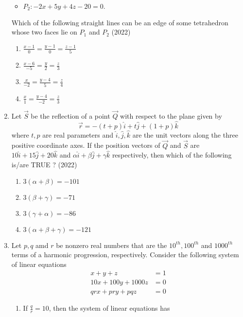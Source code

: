 \begin{enumerate}[label=\thesubsection.\arabic*.,ref=\thesubsection.\theenumi]
\begin{itemize}
 \item $P_2 : -2x + 5y + 4z - 20 = 0$.
\end{itemize}
Which of the following straight lines can be an edge of some tetrahedron whose two faces lie on $P_1$
and $P_2$ 
  \hfill (2022)
\begin{multicols}{2}
\begin{enumerate}
	 \item $\frac{x-1}{0} =\frac{y-1}{0} =\frac{z-1}{5}$ 
	 \item $\frac{x-6}{-5} =\frac{y}{2} =\frac{z}{3}$
	 \item $\frac{x}{-2} =\frac{y-4}{5} =\frac{z}{4}$
	 \item $\frac{x}{1} =\frac{y-4}{-2} =\frac{z}{3}$
\end{enumerate}
\end{multicols}
 \item  Let $\vec{S}$ be the reflection of a point $\vec{Q}$ with respect to the plane given by
$$\overrightarrow{r}=-(t+p)\hat{i}+t\hat{j}+(1+p)\hat{k}$$
 where $t, p$ are real parameters and $\hat{i}, \hat{j} ,\hat{k}$ are the unit vectors along the three positive coordinate 
axes. If the position vectors of $\vec{Q}$ and $\vec{S}$ are $10\hat{i}+ 15\hat{j}+ 20\hat{k} $ and $\alpha\hat{i}+ \beta\hat{j}+ \gamma\hat{k}$ respectively, then which of the following is/are TRUE ?
	\hfill (2022)
\begin{multicols}{2}
\begin{enumerate}
  \item $3(\alpha + \beta) = -101$
  \item $3(\beta + \gamma) = -71$
  \item $3(\gamma + \alpha) = -86$
  \item $3(\alpha + \beta + \gamma) = -121$
\end{enumerate}
\end{multicols}
 \item Let $p,q$ amd $r$  be nonzero real numbers that are the $10^{th}, 100^{th}$ and $1000^{th}$ terms of a harmonic progression, respectively. Consider the following system of linear equations
\begin{align*}
	x + y + z &= 1
	\\
	10x + 100y + 1000z &= 0
	\\
	qr x + pr y + pq z &= 0
\end{align*}
\begin{multicols}{2}
	\begin{enumerate}[label=(\Roman*),itemsep=1ex]
		\item	If $ \frac{q}{r} = 10 $, then the system of linear equations has 

\end{enumerate}
\end{multicols}
\end{enumerate}
